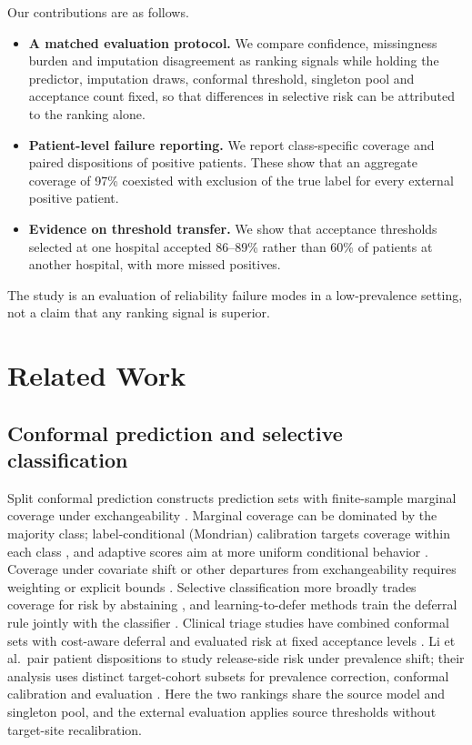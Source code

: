 Our contributions are as follows.

\begin{itemize}
  \item \textbf{A matched evaluation protocol.} We compare confidence, missingness burden and imputation disagreement as ranking signals while holding the predictor, imputation draws, conformal threshold, singleton pool and acceptance count fixed, so that differences in selective risk can be attributed to the ranking alone.
  \item \textbf{Patient-level failure reporting.} We report class-specific coverage and paired dispositions of positive patients. These show that an aggregate coverage of 97\% coexisted with exclusion of the true label for every external positive patient.
  \item \textbf{Evidence on threshold transfer.} We show that acceptance thresholds selected at one hospital accepted 86--89\% rather than 60\% of patients at another hospital, with more missed positives.
\end{itemize}

The study is an evaluation of reliability failure modes in a low-prevalence setting, not a claim that any ranking signal is superior.

\section{Related Work}

\subsection{Conformal prediction and selective classification}

Split conformal prediction constructs prediction sets with finite-sample marginal coverage under exchangeability \cite{vovk2005algorithmic,angelopoulos2023conformal}. Marginal coverage can be dominated by the majority class; label-conditional (Mondrian) calibration targets coverage within each class \cite{vovk2005algorithmic,sadinle2019least}, and adaptive scores aim at more uniform conditional behavior \cite{romano2020classification}. Coverage under covariate shift or other departures from exchangeability requires weighting or explicit bounds \cite{tibshirani2019covariate,barber2023beyond}. Selective classification more broadly trades coverage for risk by abstaining \cite{chow1970optimum,geifman2017selective}, and learning-to-defer methods train the deferral rule jointly with the classifier \cite{mozannar2020consistent}. Clinical triage studies have combined conformal sets with cost-aware deferral and evaluated risk at fixed acceptance levels \cite{kwon2026conformal}. Li et al.\ pair patient dispositions to study release-side risk under prevalence shift; their analysis uses distinct target-cohort subsets for prevalence correction, conformal calibration and evaluation \cite{li2026deployment}. Here the two rankings share the source model and singleton pool, and the external evaluation applies source thresholds without target-site recalibration.

